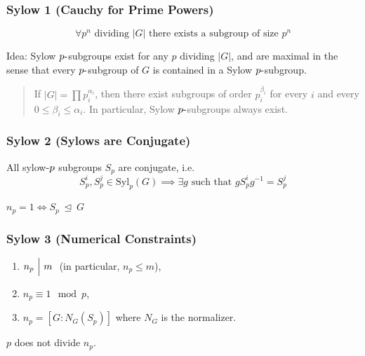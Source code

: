 \hypertarget{sylow-1-cauchy-for-prime-powers}{%
\subsubsection{Sylow 1 (Cauchy for Prime
Powers)}\label{sylow-1-cauchy-for-prime-powers}}

\[
\forall p^n \text{ dividing } {\left\lvert {G} \right\rvert} \text{ there exists a subgroup of size } p^n
\]

Idea: Sylow \(p{\hbox{-}}\)subgroups exist for any \(p\) dividing
\({\left\lvert {G} \right\rvert}\), and are maximal in the sense that
every \(p{\hbox{-}}\)subgroup of \(G\) is contained in a Sylow
\(p{\hbox{-}}\)subgroup.

\begin{quote}
If \({\left\lvert {G} \right\rvert} = \prod p_i^{\alpha_i}\), then there
exist subgroups of order \(p_i^{\beta_i}\) for every \(i\) and every
\(0 \leq \beta_i \leq \alpha_i\). In particular, Sylow
\(p{\hbox{-}}\)subgroups always exist.
\end{quote}

\hypertarget{sylow-2-sylows-are-conjugate}{%
\subsubsection{Sylow 2 (Sylows are
Conjugate)}\label{sylow-2-sylows-are-conjugate}}

All sylow\({\hbox{-}}p\) subgroups \(S_p\) are conjugate, i.e. \[
S_p^i, S_p^j \in \mathrm{Syl}_p(G) \implies \exists g \text{ such that } g S_p^i g^{-1}= S_p^j
\]

\(n_p = 1 \iff S_p {~\trianglelefteq~}G\)

\hypertarget{sylow-3-numerical-constraints}{%
\subsubsection{Sylow 3 (Numerical
Constraints)}\label{sylow-3-numerical-constraints}}

\begin{enumerate}
\def\labelenumi{\arabic{enumi}.}
\item
  \(n_p {~\Bigm|~}m~\) (in particular, \(n_p \leq m\)),
\item
  \(n_p \equiv 1 \mod p\),
\item
  \(n_p = [G : N_G(S_p)]\) where \(N_G\) is the normalizer.
\end{enumerate}

\(p\) does not divide \(n_p\).

